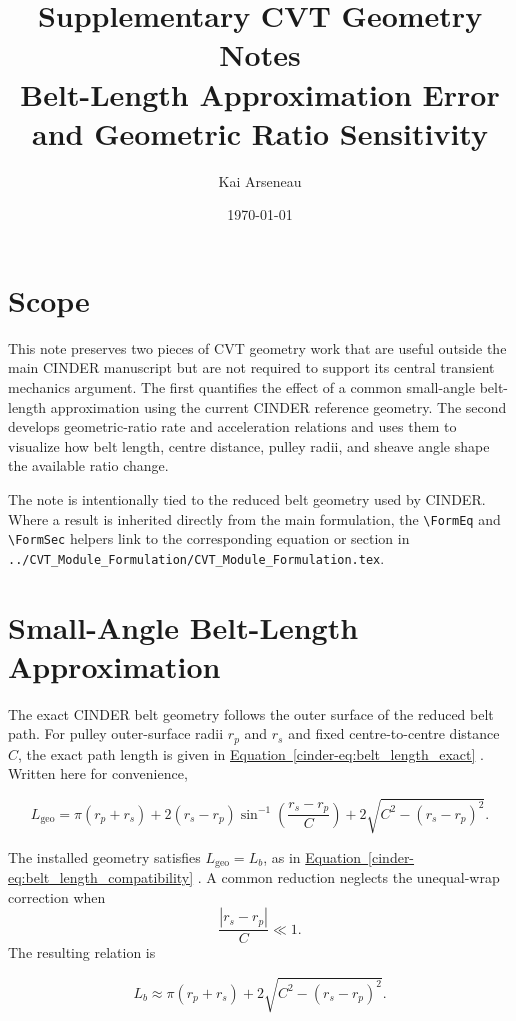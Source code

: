 \documentclass[11pt]{report}
\title{Supplementary CVT Geometry Notes\\
\large Belt-Length Approximation Error and Geometric Ratio Sensitivity}
\author{Kai Arseneau}
\date{\today}
\newcommand{\FormEq}[1]{%
    \hyperref[cinder-#1]{Equation~\ref*{cinder-#1}}%
  }
\newcommand{\FormSec}[1]{%
    \hyperref[cinder-#1]{Section~\ref*{cinder-#1}}%
  }
\newcommand{\FormEq}[1]{\textit{main formulation equation \nolinkurl{#1}}}
\newcommand{\FormSec}[1]{\textit{main formulation section \nolinkurl{#1}}}
\begin{document}
\maketitle
\tableofcontents

\chapter*{Scope}

This note preserves two pieces of CVT geometry work that are useful outside the
main CINDER manuscript but are not required to support its central transient
mechanics argument. The first quantifies the effect of a common small-angle
belt-length approximation using the current CINDER reference geometry. The
second develops geometric-ratio rate and acceleration relations and uses them
to visualize how belt length, centre distance, pulley radii, and sheave angle
shape the available ratio change.

The note is intentionally tied to the reduced belt geometry used by CINDER.
Where a result is inherited directly from the main formulation, the
\verb|\FormEq| and \verb|\FormSec| helpers link to the corresponding equation
or section in \texttt{../CVT\_Module\_Formulation/CVT\_Module\_Formulation.tex}.


\chapter{Small-Angle Belt-Length Approximation}
\label{chap:small-angle-note}

The exact CINDER belt geometry follows the outer surface of the reduced belt
path. For pulley outer-surface radii \(r_p\) and \(r_s\) and fixed
centre-to-centre distance \(C\), the exact path length is given in
\FormEq{eq:belt_length_exact}. Written here for convenience,

\begin{equation}
L_{\mathrm{geo}}
=
\pi(r_p+r_s)
+
2(r_s-r_p)\sin^{-1}\!\left(\frac{r_s-r_p}{C}\right)
+
2\sqrt{C^2-(r_s-r_p)^2}.
\label{eq:note-belt-length-exact}
\end{equation}

The installed geometry satisfies \(L_{\mathrm{geo}}=L_b\), as in
\FormEq{eq:belt_length_compatibility}. A common reduction neglects the
unequal-wrap correction when
\[
\frac{|r_s-r_p|}{C}\ll1.
\]
The resulting relation is

\begin{equation}
L_b
\approx
\pi(r_p+r_s)
+
2\sqrt{C^2-(r_s-r_p)^2}.
\label{eq:belt-length-small-angle}
\end{equation}
\end{document}
